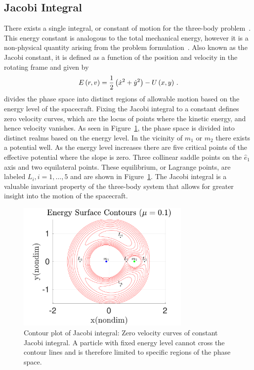 \subsection{Jacobi Integral}\label{sec:jacobi}
There exists a single integral, or constant of motion for the three-body problem~\cite{szebehely1967,lanczos1970}.
This energy constant is analogous to the total mechanical energy, however it is a non-physical quantity arising from the problem formulation~\cite{szebehely1967}.
Also known as the Jacobi constant, it is defined as a function of the position and velocity in the rotating frame and given by
\begin{equation}
        E\left( r , v \right) = \frac{1}{2}\left( \dot{x}^2 + \dot{y}^2\right) - U\left(x,y \right) \, .
        \label{eq:jacobi}
\end{equation}
 divides the phase space into distinct regions of allowable motion based on the energy level of the spacecraft.
Fixing the Jacobi integral to a constant defines zero velocity curves, which are the locus of points where the kinetic energy, and hence velocity vanishes.
As seen in Figure~\ref{fig:energy_contour}, the phase space is divided into distinct realms based on the energy level.
In the vicinity of \( m_1\) or \(m_2\) there exists a potential well. 
As the energy level increases there are five critical points of the effective potential where the slope is zero.
Three collinear saddle points on the \(\hat{e}_1\) axis and two equilateral points.
These equilibrium, or Lagrange points, are labeled \( L_i, i = 1, \hdots, 5 \) and are shown in Figure~\ref{fig:energy_contour}.
The Jacobi integral is a valuable invariant property of the three-body system that allows for greater insight into the motion of the spacecraft.
\begin{figure}[htbp]
        \centering
        \includegraphics[width=0.75\textwidth]{./figures/2017_JAS/energy_contours.pdf}
        \caption[Jacobi integral]{Contour plot of Jacobi integral: Zero velocity curves of constant Jacobi integral. A particle with fixed energy level cannot cross the contour lines and is therefore limited to specific regions of the phase space. }
        \label{fig:energy_contour}
\end{figure} 

